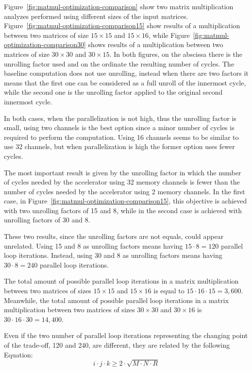 Figure~\ref{fig:matmul-optimization-comparison} show two matrix multiplication analyzes performed using different sizes of the input matrices.
Figure~\ref{fig:matmul-optimization-comparison15} show results of a multiplication between two matrices of size $15\times15$ and $15\times16$, while Figure~\ref{fig:matmul-optimization-comparison30} shows results of a multiplication between two matrices of size $30\times30$ and $30\times15$.
In both figures, on the abscissa there is the unrolling factor used and on the ordinate the resulting number of cycles.
The baseline computation does not use unrolling, instead when there are two factors it means that the first one can be considered as a full unroll of the innermost cycle, while the second one is the unrolling factor applied to the original second innermost cycle.

In both cases, when the parallelization is not high, thus the unrolling factor is small, using two channels is the best option since a minor number of cycles is required to perform the computation.
Using 16 channels seems to be similar to use 32 channels, but when parallelization is high the former option uses fewer cycles.

The most important result is given by the unrolling factor in which the number of cycles needed by the accelerator using 32 memory channels is fewer than the number of cycles needed by the accelerator using 2 memory channels.
In the first case, in Figure~\ref{fig:matmul-optimization-comparison15}, this objective is achieved with two unrolling factors of 15 and 8, while in the second case is achieved with unrolling factors of 30 and 8.

These two results, since the unrolling factors are not equals, could appear unrelated.
Using 15 and 8 as unrolling factors means having $15 \cdot 8 = 120$ parallel loop iterations.
Instead, using 30 and 8 as unrolling factors means having $30 \cdot 8 = 240$ parallel loop iterations.

The total amount of possible parallel loop iterations in a matrix multiplication between two matrices of sizes $15\times15$ and $15\times16$ is equal to $15 \cdot 16 \cdot 15 = 3,600$.
Meanwhile, the total amount of possible parallel loop iterations in a matrix multiplication between two matrices of sizes $30\times30$ and $30\times16$ is $30 \cdot 16 \cdot 30 = 14,400$.

Even if the two number of parallel loop iterations representing the changing point of the trade-off, 120 and 240, are different, they are related by the following Equation:
\begin{equation}
    \label{eq:factor-relation}
        i \cdot j \cdot k \geq 2 \cdot \sqrt {M \cdot N \cdot R}
\end{equation}


